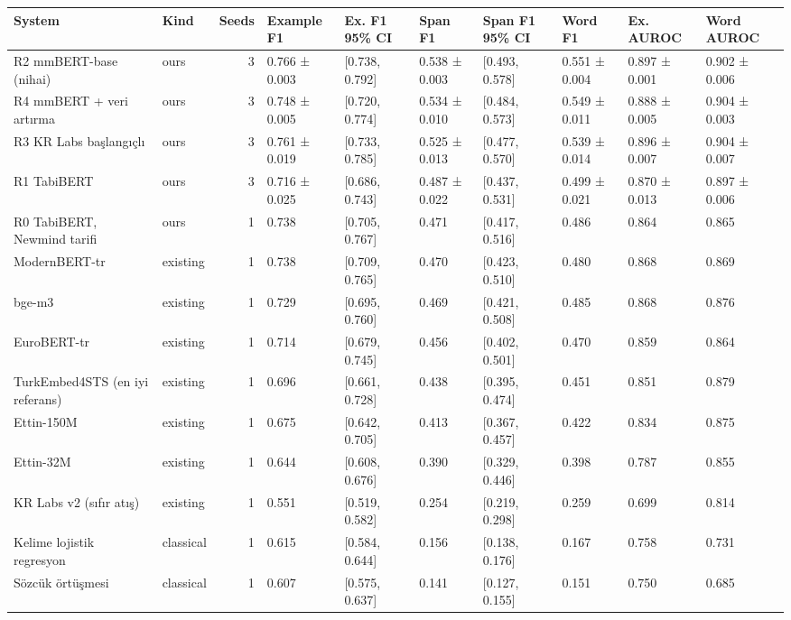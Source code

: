 \begin{tabular}{llrlllllll}
\toprule
System & Kind & Seeds & Example F1 & Ex. F1 95\% CI & Span F1 & Span F1 95\% CI & Word F1 & Ex. AUROC & Word AUROC \\
\midrule
R2 mmBERT-base (nihai) & ours & 3 & 0.766 ± 0.003 & [0.738, 0.792] & 0.538 ± 0.003 & [0.493, 0.578] & 0.551 ± 0.004 & 0.897 ± 0.001 & 0.902 ± 0.006 \\
R4 mmBERT + veri artırma & ours & 3 & 0.748 ± 0.005 & [0.720, 0.774] & 0.534 ± 0.010 & [0.484, 0.573] & 0.549 ± 0.011 & 0.888 ± 0.005 & 0.904 ± 0.003 \\
R3 KR Labs başlangıçlı & ours & 3 & 0.761 ± 0.019 & [0.733, 0.785] & 0.525 ± 0.013 & [0.477, 0.570] & 0.539 ± 0.014 & 0.896 ± 0.007 & 0.904 ± 0.007 \\
R1 TabiBERT & ours & 3 & 0.716 ± 0.025 & [0.686, 0.743] & 0.487 ± 0.022 & [0.437, 0.531] & 0.499 ± 0.021 & 0.870 ± 0.013 & 0.897 ± 0.006 \\
R0 TabiBERT, Newmind tarifi & ours & 1 & 0.738 & [0.705, 0.767] & 0.471 & [0.417, 0.516] & 0.486 & 0.864 & 0.865 \\
ModernBERT-tr & existing & 1 & 0.738 & [0.709, 0.765] & 0.470 & [0.423, 0.510] & 0.480 & 0.868 & 0.869 \\
bge-m3 & existing & 1 & 0.729 & [0.695, 0.760] & 0.469 & [0.421, 0.508] & 0.485 & 0.868 & 0.876 \\
EuroBERT-tr & existing & 1 & 0.714 & [0.679, 0.745] & 0.456 & [0.402, 0.501] & 0.470 & 0.859 & 0.864 \\
TurkEmbed4STS (en iyi referans) & existing & 1 & 0.696 & [0.661, 0.728] & 0.438 & [0.395, 0.474] & 0.451 & 0.851 & 0.879 \\
Ettin-150M & existing & 1 & 0.675 & [0.642, 0.705] & 0.413 & [0.367, 0.457] & 0.422 & 0.834 & 0.875 \\
Ettin-32M & existing & 1 & 0.644 & [0.608, 0.676] & 0.390 & [0.329, 0.446] & 0.398 & 0.787 & 0.855 \\
KR Labs v2 (sıfır atış) & existing & 1 & 0.551 & [0.519, 0.582] & 0.254 & [0.219, 0.298] & 0.259 & 0.699 & 0.814 \\
Kelime lojistik regresyon & classical & 1 & 0.615 & [0.584, 0.644] & 0.156 & [0.138, 0.176] & 0.167 & 0.758 & 0.731 \\
Sözcük örtüşmesi & classical & 1 & 0.607 & [0.575, 0.637] & 0.141 & [0.127, 0.155] & 0.151 & 0.750 & 0.685 \\
\bottomrule
\end{tabular}
